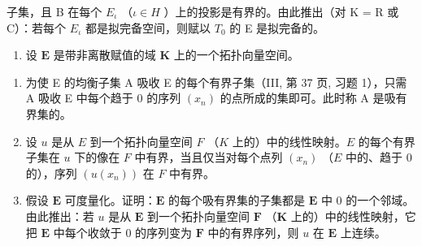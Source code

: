 子集，且 B 在每个 \(E_{\iota}\) （\(\iota \in H\) ）上的投影是有界的。由此推出（对 K = R 或 C）：若每个 \(E_{\iota}\) 都是拟完备空间，则赋以 \(T_{0}\) 的 E 是拟完备的。

\begin{enumerate}
\def\labelenumi{\arabic{enumi})}
\setcounter{enumi}{10}
\tightlist
\item
  设 \(\mathbf{E}\) 是带非离散赋值的域 \(\mathbf{K}\) 上的一个拓扑向量空间。
\end{enumerate}

\begin{enumerate}
\def\labelenumi{\alph{enumi})}
\item
  为使 E 的均衡子集 A 吸收 E 的每个有界子集（III, 第 37 页, 习题 1），只需 A 吸收 E 中每个趋于 0 的序列 \((x_{n})\) 的点所成的集即可。此时称 A 是吸有界集的。
\item
  设 \(u\) 是从 \(E\) 到一个拓扑向量空间 \(F\) （\(K\) 上的）中的线性映射。\(E\) 的每个有界子集在 \(u\) 下的像在 \(F\) 中有界，当且仅当对每个点列 \((x_{n})\) （\(E\) 中的、趋于 0 的），序列 \((u(x_{n}))\) 在 \(F\) 中有界。
\item
  假设 \(\mathbf{E}\) 可度量化。证明：\(\mathbf{E}\) 的每个吸有界集的子集都是 \(\mathbf{E}\) 中 0 的一个邻域。由此推出：若 \(u\) 是从 \(\mathbf{E}\) 到一个拓扑向量空间 \(\mathbf{F}\) （\(\mathbf{K}\) 上的）中的线性映射，它把 \(\mathbf{E}\) 中每个收敛于 0 的序列变为 \(\mathbf{F}\) 中的有界序列，则 \(u\) 在 \(\mathbf{E}\) 上连续。
\end{enumerate}

